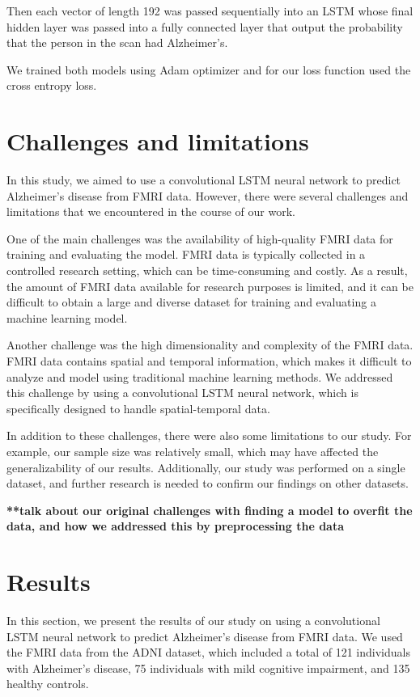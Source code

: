 \documentclass[10pt]{article}
\begin{document}
	Then each vector of length 192 was passed sequentially into an LSTM whose final hidden layer was passed into a fully connected layer that output the probability that the person in the scan had Alzheimer's.

	We trained both models using Adam optimizer and for our loss function used the cross entropy loss. 


	\section{Challenges and limitations}

	In this study, we aimed to use a convolutional LSTM neural network to predict Alzheimer's disease from FMRI data. However, there were several challenges and limitations that we encountered in the course of our work.

	One of the main challenges was the availability of high-quality FMRI data for training and evaluating the model. FMRI data is typically collected in a controlled research setting, which can be time-consuming and costly. As a result, the amount of FMRI data available for research purposes is limited, and it can be difficult to obtain a large and diverse dataset for training and evaluating a machine learning model.

	Another challenge was the high dimensionality and complexity of the FMRI data. FMRI data contains spatial and temporal information, which makes it difficult to analyze and model using traditional machine learning methods. We addressed this challenge by using a convolutional LSTM neural network, which is specifically designed to handle spatial-temporal data.

	In addition to these challenges, there were also some limitations to our study. For example, our sample size was relatively small, which may have affected the generalizability of our results. Additionally, our study was performed on a single dataset, and further research is needed to confirm our findings on other datasets.

	\textbf{**talk about our original challenges with finding a model to overfit the data, and how we addressed this by preprocessing the data}

	\section{Results}

	In this section, we present the results of our study on using a convolutional LSTM neural network to predict Alzheimer's disease from FMRI data. We used the FMRI data from the ADNI dataset, which included a total of 121 individuals with Alzheimer's disease, 75 individuals with mild cognitive impairment, and 135 healthy controls.
\end{document}
